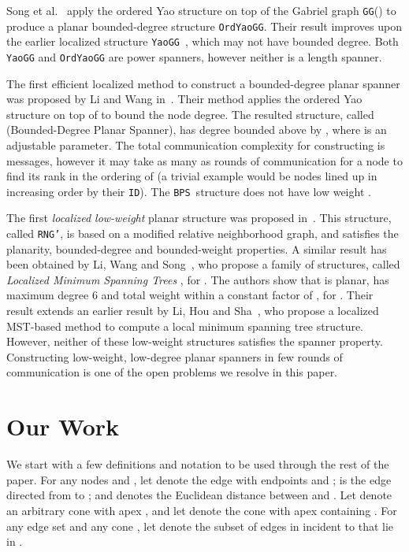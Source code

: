 \documentclass{llncs}
\newcommand{\id}{{\tt ID}}
\newcommand{\bps}{{\tt BPS}}
\begin{document}
Song et al.~\cite{SWLF04} apply the ordered Yao structure
on top of the Gabriel graph {\tt GG}() to produce
a planar bounded-degree structure {\tt OrdYaoGG}. Their result improves
upon the earlier localized structure
{\tt YaoGG}~\cite{li02sparse}, which may not have bounded degree. Both
{\tt YaoGG} and {\tt OrdYaoGG} are power spanners, however neither is a length spanner. 

The first efficient localized method to construct a bounded-degree
planar spanner was proposed by Li and Wang in~\cite{WangLi03,LiWang04}.
Their method applies the ordered Yao structure on top of  to
bound the node degree. The resulted structure, called 
(Bounded-Degree Planar Spanner), has degree bounded above by
,
where  is an adjustable parameter.
The total communication complexity for constructing  is
 messages, however it may take as many as  rounds of
communication for a node to find its rank in the ordering of 
(a trivial example would be  nodes
lined up in increasing order by their \id).
The \bps\ structure does not have low weight \cite{li-localmst-03}.

The first \emph{localized low-weight} planar structure was proposed
in~\cite{li-localmst-03}. This structure, called {\tt RNG'},
is based on a modified relative neighborhood graph, and satisfies the planarity,
bounded-degree and bounded-weight properties.
A similar result has been obtained by Li, Wang and Song~\cite{lws-ieee-04},
who propose a family of structures, called \emph{Localized Minimum Spanning Trees}
, for . The authors show that  is planar, has
maximum degree 6 and total weight within a constant factor of ,
for . Their result extends an earlier result by Li, Hou and
Sha~\cite{lhs-infocom-03}, who propose a localized MST-based method to
compute a local minimum spanning tree structure.
However, neither of these low-weight structures satisfies the spanner property.
Constructing low-weight, low-degree planar spanners in few rounds of
communication is one of the open problems we resolve in this paper.

\section{Our Work}
We start with a few definitions and notation to be used through
the rest of the paper. For any nodes  and , let  denote the
edge with endpoints  and ;
 is the edge directed from  to ; and
 denotes the Euclidean distance between  and .
Let  denote an arbitrary cone with
apex , and let  denote the cone with apex  containing .
For any edge set  and any cone , let  denote the
subset of edges in  incident to  that lie in .
\end{document}
